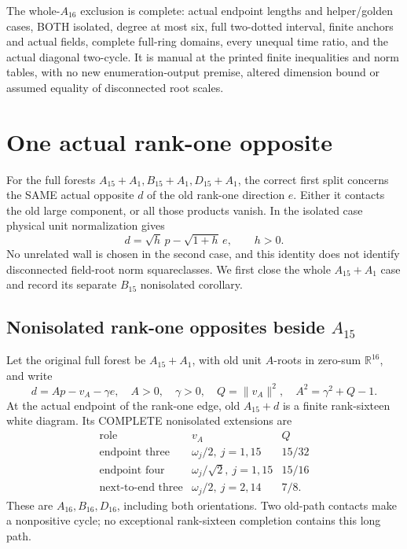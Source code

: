 The whole-\(A_{16}\) exclusion is complete: actual endpoint
lengths and helper/golden cases, BOTH isolated, degree at most six,
full two-dotted interval, finite anchors and actual fields, complete
full-ring domains, every unequal time ratio, and the actual
diagonal two-cycle.
It is manual at the printed finite inequalities and norm tables,
with no new enumeration-output premise, altered dimension bound
or assumed equality of disconnected root scales.

\section{One actual rank-one opposite}
\label{app:arithrankone}

For the full forests \(A_{15}+A_1,B_{15}+A_1,D_{15}+A_1\),
the correct first split concerns the SAME actual opposite \(d\)
of the old rank-one direction \(e\).
Either it contacts the old large component, or all those products
vanish.  In the isolated case physical unit normalization gives
\[
                 d=\sqrt h\,p-\sqrt{1+h}\,e,\qquad h>0 .
\]
No unrelated wall is chosen in the second case, and this identity
does not identify disconnected field-root norm squareclasses.
We first close the whole \(A_{15}+A_1\) case and record its
separate \(B_{15}\) nonisolated corollary.

\subsection{Nonisolated rank-one opposites beside \(A_{15}\)}
\label{app:arithA15nonisolated}

Let the original full forest be \(A_{15}+A_1\), with old
unit \(A\)-roots in zero-sum \(\mathbb R^{16}\), and write
\[
 d=Ap-v_A-\gamma e,\quad A>0,\quad\gamma>0,\quad
 Q=\|v_A\|^2,\quad A^2=\gamma^2+Q-1.
\]
At the actual endpoint of the rank-one edge, old \(A_{15}+d\)
is a finite rank-sixteen white diagram.
Its COMPLETE nonisolated extensions are
\[
\begin{array}{c|c|c}
\text{role}&v_A&Q\\ \hline
\text{endpoint three}&\omega_j/2,\ j=1,15&15/32\\
\text{endpoint four}&\omega_j/\sqrt2,\ j=1,15&15/16\\
\text{next-to-end three}&\omega_j/2,\ j=2,14&7/8 .
\end{array}
\]
These are \(A_{16},B_{16},D_{16}\), including both orientations.
Two old-path contacts make a nonpositive cycle; no exceptional
rank-sixteen completion contains this long path.

